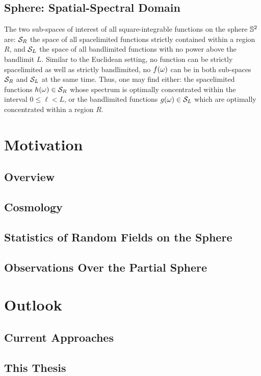 \subsection{Sphere: Spatial-Spectral Domain}\label{sec:chapter2_slepian_sphere}

The two sub-spaces of interest of all square-integrable functions on the sphere \(\mathbb{S}^{2}{}\) are: \(\mathcal{S}_{R}{}\) the space of all spacelimited functions strictly contained within a region \(R\), and \(\mathcal{S}_{L}{}\) the space of all bandlimited functions with no power above the bandlimit \(L\).
Similar to the Euclidean setting, no function can be strictly spacelimited as well as strictly bandlimited, \ie{} no \(f(\omega)\) can be in both sub-spaces \(\mathcal{S}_{R}{}\) and \(\mathcal{S}_{L}{}\) at the same time.
Thus, one may find either: the spacelimited functions \(h(\omega) \in \mathcal{S}_{R}{}\) whose spectrum is optimally concentrated within the interval \(0 \leq \ell < L\), or the bandlimited functions \(g(\omega) \in \mathcal{S}_{L}{}\) which are optimally concentrated within a region \(R\).









\section{Motivation}

\subsection{Overview}

\subsection{Cosmology}





\subsection{Statistics of Random Fields on the Sphere}

\subsection{Observations Over the Partial Sphere}

\section{Outlook}

\subsection{Current Approaches}

\subsection{This Thesis}
